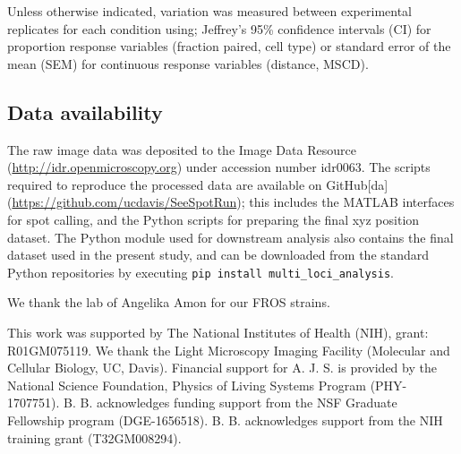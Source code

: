 \documentclass[9pt,twocolumn,twoside,lineno]{pnas-new}
\begin{document}
Unless otherwise indicated, variation was measured between experimental
replicates for each condition using; Jeffrey's 95\% confidence intervals (CI)
for proportion response variables (fraction paired, cell type) or standard error
of the mean (SEM) for continuous response variables (distance, MSCD).

\subsection*{Data availability}

The raw image data was deposited to the Image Data Resource
(\url{http://idr.openmicroscopy.org}) under accession number idr0063. The
scripts required to reproduce the processed data are available on GitHub[da]
(\url{https://github.com/ucdavis/SeeSpotRun}); this includes the MATLAB
interfaces for spot calling, and the Python scripts for preparing the final xyz
position dataset. The Python module used for downstream analysis also contains
the final dataset used in the present study, and can be downloaded from the
standard Python repositories by executing \texttt{pip install
multi\_loci\_analysis}.


\acknow{}
\showacknow{}

We thank the lab of Angelika Amon for our FROS strains.

This work was supported by The National Institutes of Health (NIH), grant: R01GM075119.
We thank the Light Microscopy Imaging Facility (Molecular and Cellular Biology, UC, Davis).
Financial support for A. J. S. is provided by the National Science Foundation, Physics of Living Systems Program (PHY-1707751).
B. B. acknowledges funding support from the NSF Graduate Fellowship program (DGE-1656518). B. B. acknowledges support from the NIH training grant (T32GM008294).



\end{document}
